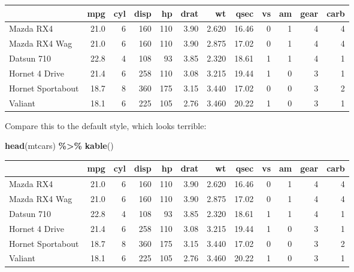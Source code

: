 \documentclass[a4paper, nobind]{templates/ociamthesis}
\newenvironment{Shaded}{\begin{snugshade}}{\end{snugshade}}
\newcommand{\FunctionTok}[1]{\textcolor[rgb]{0.13,0.29,0.53}{\textbf{#1}}}
\newcommand{\NormalTok}[1]{#1}
\newcommand{\SpecialCharTok}[1]{\textcolor[rgb]{0.81,0.36,0.00}{\textbf{#1}}}
\renewenvironment{Shaded}
{
  \vspace{10pt}%
  \begin{snugshade}%
}{%
  \end{snugshade}%
  \vspace{8pt}%
}
\begin{document}
\begin{tabular}{lrrrrrrrrrrr}
\toprule
  & mpg & cyl & disp & hp & drat & wt & qsec & vs & am & gear & carb\\
\midrule
Mazda RX4 & 21.0 & 6 & 160 & 110 & 3.90 & 2.620 & 16.46 & 0 & 1 & 4 & 4\\
Mazda RX4 Wag & 21.0 & 6 & 160 & 110 & 3.90 & 2.875 & 17.02 & 0 & 1 & 4 & 4\\
Datsun 710 & 22.8 & 4 & 108 & 93 & 3.85 & 2.320 & 18.61 & 1 & 1 & 4 & 1\\
Hornet 4 Drive & 21.4 & 6 & 258 & 110 & 3.08 & 3.215 & 19.44 & 1 & 0 & 3 & 1\\
Hornet Sportabout & 18.7 & 8 & 360 & 175 & 3.15 & 3.440 & 17.02 & 0 & 0 & 3 & 2\\
\addlinespace
Valiant & 18.1 & 6 & 225 & 105 & 2.76 & 3.460 & 20.22 & 1 & 0 & 3 & 1\\
\bottomrule
\end{tabular}

\vspace{4mm}

Compare this to the default style, which looks terrible:

\begin{Shaded}
\begin{Highlighting}[]
\FunctionTok{head}\NormalTok{(mtcars) }\SpecialCharTok{\%\textgreater{}\%} 
  \FunctionTok{kable}\NormalTok{()}
\end{Highlighting}
\end{Shaded}

\begin{tabular}{l|r|r|r|r|r|r|r|r|r|r|r}
\hline
  & mpg & cyl & disp & hp & drat & wt & qsec & vs & am & gear & carb\\
\hline
Mazda RX4 & 21.0 & 6 & 160 & 110 & 3.90 & 2.620 & 16.46 & 0 & 1 & 4 & 4\\
\hline
Mazda RX4 Wag & 21.0 & 6 & 160 & 110 & 3.90 & 2.875 & 17.02 & 0 & 1 & 4 & 4\\
\hline
Datsun 710 & 22.8 & 4 & 108 & 93 & 3.85 & 2.320 & 18.61 & 1 & 1 & 4 & 1\\
\hline
Hornet 4 Drive & 21.4 & 6 & 258 & 110 & 3.08 & 3.215 & 19.44 & 1 & 0 & 3 & 1\\
\hline
Hornet Sportabout & 18.7 & 8 & 360 & 175 & 3.15 & 3.440 & 17.02 & 0 & 0 & 3 & 2\\
\hline
Valiant & 18.1 & 6 & 225 & 105 & 2.76 & 3.460 & 20.22 & 1 & 0 & 3 & 1\\
\hline
\end{tabular}
\end{document}
